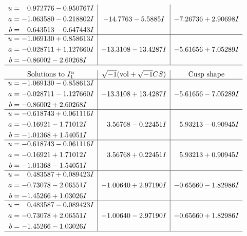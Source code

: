 \documentclass[1p]{elsarticle_modified}
\theoremstyle{definition}
\newcommand{\I}{\sqrt{-1}}
\begin{document}
$$\begin{array}{c|c|c}
\begin{aligned}
u &= \phantom{-}0.972776 - 0.950767 I \\
a &= -1.063580 - 0.218802 I \\
b &= \phantom{-}0.643513 - 0.647443 I\end{aligned}
 & -14.7763 - 5.5885 I & -7.26736 + 2.90698 I \\ \hline\begin{aligned}
u &= -1.069130 + 0.858613 I \\
a &= -0.028711 + 1.127660 I \\
b &= -0.86002 - 2.60268 I\end{aligned}
 & -13.3108 - 13.4287 I & -5.61656 + 7.05289 I\\
 \hline 
 \end{array}$$\newpage$$\begin{array}{c|c|c}  
\text{Solutions to }I^u_{1}& \I (\text{vol} + \sqrt{-1}CS) & \text{Cusp shape}\\
 \hline 
\begin{aligned}
u &= -1.069130 - 0.858613 I \\
a &= -0.028711 - 1.127660 I \\
b &= -0.86002 + 2.60268 I\end{aligned}
 & -13.3108 + 13.4287 I & -5.61656 - 7.05289 I \\ \hline\begin{aligned}
u &= -0.618743 + 0.061116 I \\
a &= -0.16921 - 1.71012 I \\
b &= -1.01368 + 1.54051 I\end{aligned}
 & \phantom{-}3.56768 - 0.22451 I & \phantom{-}5.93213 - 0.90945 I \\ \hline\begin{aligned}
u &= -0.618743 - 0.061116 I \\
a &= -0.16921 + 1.71012 I \\
b &= -1.01368 - 1.54051 I\end{aligned}
 & \phantom{-}3.56768 + 0.22451 I & \phantom{-}5.93213 + 0.90945 I \\ \hline\begin{aligned}
u &= \phantom{-}0.483587 + 0.089423 I \\
a &= -0.73078 - 2.06551 I \\
b &= -1.45266 + 1.03026 I\end{aligned}
 & -1.00640 + 2.97190 I & -0.65660 - 1.82986 I \\ \hline\begin{aligned}
u &= \phantom{-}0.483587 - 0.089423 I \\
a &= -0.73078 + 2.06551 I \\
b &= -1.45266 - 1.03026 I\end{aligned}
 & -1.00640 - 2.97190 I & -0.65660 + 1.82986 I\\
 \hline 
 \end{array}$$\newpage\newpage\renewcommand{\arraystretch}{1}
\end{document}
